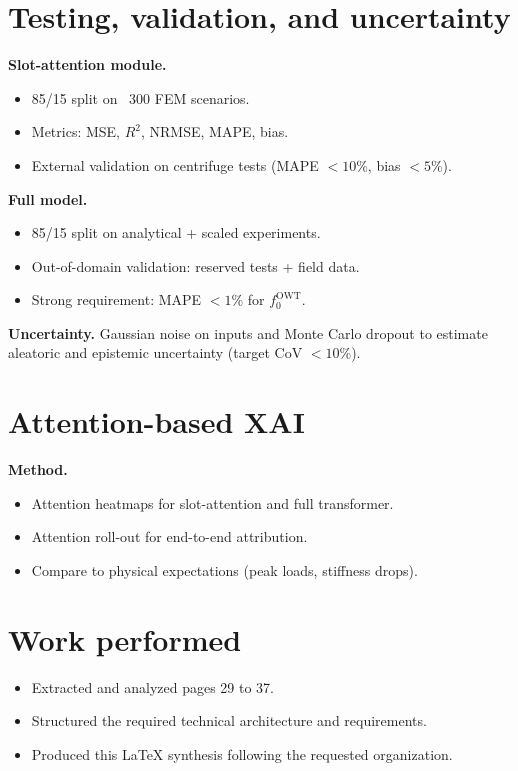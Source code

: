 \documentclass[11pt]{article}
\begin{document}
\section{Testing, validation, and uncertainty}
\textbf{Slot-attention module.}
\begin{itemize}
  \item 85/15 split on ~300 FEM scenarios.
  \item Metrics: MSE, $R^2$, NRMSE, MAPE, bias.
  \item External validation on centrifuge tests (MAPE $< 10\%$, bias $< 5\%$).
\end{itemize}

\textbf{Full model.}
\begin{itemize}
  \item 85/15 split on analytical + scaled experiments.
  \item Out-of-domain validation: reserved tests + field data.
  \item Strong requirement: MAPE $< 1\%$ for $f_0^{\mathrm{OWT}}$.
\end{itemize}

\textbf{Uncertainty.} Gaussian noise on inputs and Monte Carlo dropout to estimate
aleatoric and epistemic uncertainty (target CoV $< 10\%$).

\section{Attention-based XAI}
\textbf{Method.}
\begin{itemize}
  \item Attention heatmaps for slot-attention and full transformer.
  \item Attention roll-out for end-to-end attribution.
  \item Compare to physical expectations (peak loads, stiffness drops).
\end{itemize}

\section{Work performed}
\begin{itemize}
  \item Extracted and analyzed pages 29 to 37.
  \item Structured the required technical architecture and requirements.
  \item Produced this LaTeX synthesis following the requested organization.
\end{itemize}
\end{document}
